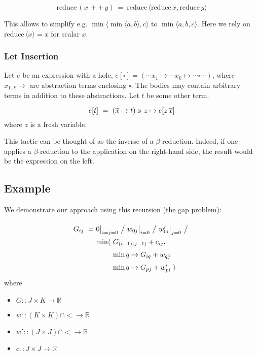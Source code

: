 \documentclass{article}
\newcommand\R{\mathbb{R}}
\begin{document}
\[\mathrm{reduce}\,(x {\scriptstyle\,++\,} y) ~=~ \mathrm{reduce}\,\langle \mathrm{reduce}\,x, \mathrm{reduce}\,y\rangle\]

This allows to simplify e.g. $\min\langle \min\langle a,b\rangle, c\rangle$ to $\min\langle a,b,c\rangle$.
Here we rely on $\mathrm{reduce}\,\langle x\rangle=x$ for scalar $x$.

\subsubsection{Let Insertion}

Let $e$ be an expression with a hole, $e[\square] = (\cdots x_1 \mapsto \cdots x_k\mapsto \cdots \square \cdots)$, 
where $x_{1..k}\mapsto$ are abstraction terms enclosing $\square$. The bodies may contain arbitrary terms
in addition to these abstractions. Let $t$ be some other term.

\[e[t] ~=~ (\overline{x}\mapsto t) ~\applt~ z\mapsto e[z\,\overline{x}]\]
%
where $z$ is a fresh variable.

\medskip
This tactic can be thought of as the inverse of a $\beta$-reduction. Indeed, if one applies a
$\beta$-reduction to the application on the right-hand side, the result would be the expression
on the left.

\subsection{Example}

We demonstrate our approach using this recursion (the gap problem):

\[
\renewcommand\arraystretch{1.5}
\begin{array}{l@{}l}
G_{ij} ~=~  &
  0\big|_{i=j=0} ~\big/~ w_{0j}\big|_{i=0} ~\big/~ w'_{0i}\big|_{j=0}
  ~\big/~ \\
  &
  \begin{array}{@{}l@{~}l}
    \min\langle & G_{(i-1)(j-1)} + c_{ij}, \\
                & \min q\mapsto G_{iq} + w_{qj} \\
                & \min q\mapsto G_{pj} + w'_{pi}~\rangle
  \end{array}
\end{array}
\]
%
where
\begin{itemize}
  \item $G :: J\times K \to \R$
  \item $w :: (K \times K)\cap{<} \to \R$
  \item $w' :: (J \times J)\cap{<} \to \R$
  \item $c :: J \times J \to \R$
\end{itemize}
\end{document}
